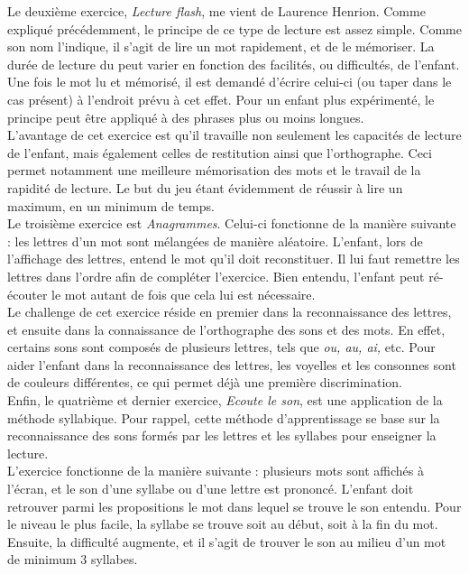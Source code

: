 Le deuxième exercice, \textit{Lecture flash}, me vient de Laurence Henrion. Comme expliqué précédemment, le principe de ce type de lecture est assez simple. Comme son nom l'indique, il s'agit de lire un mot rapidement, et de le mémoriser. La durée de lecture du peut varier en fonction des facilités, ou difficultés, de l'enfant. Une fois le mot lu et mémorisé, il est demandé d'écrire celui-ci (ou taper dans le cas présent) à l'endroit prévu à cet effet. Pour un enfant plus expérimenté, le principe peut être appliqué à des phrases plus ou moins longues.\\

L'avantage de cet exercice est qu'il travaille non seulement les capacités de lecture de l'enfant, mais également celles de restitution ainsi que l'orthographe. Ceci permet notamment une meilleure mémorisation des mots et le travail de la rapidité de lecture. Le but du jeu étant évidemment de réussir à lire un maximum, en un minimum de temps. \\

Le troisième exercice est \textit{Anagrammes}. Celui-ci fonctionne de la manière suivante : les lettres d'un mot sont mélangées de manière aléatoire. L'enfant, lors de l'affichage des lettres, entend le mot qu'il doit reconstituer. Il lui faut remettre les lettres dans l'ordre afin de compléter l'exercice. Bien entendu, l'enfant peut ré-écouter le mot autant de fois que cela lui est nécessaire.\\

Le challenge de cet exercice réside en premier dans la reconnaissance des lettres, et ensuite dans la connaissance de l'orthographe des sons et des mots. En effet, certains sons sont composés de plusieurs lettres, tels que \textit{ou, au, ai,} etc. Pour aider l'enfant dans la reconnaissance des lettres, les voyelles et les consonnes sont de couleurs différentes, ce qui permet déjà une première discrimination.\\

Enfin, le quatrième et dernier exercice, \textit{Ecoute le son}, est une application de la méthode syllabique. Pour rappel, cette méthode d'apprentissage se base sur la reconnaissance des sons formés par les lettres et les syllabes pour enseigner la lecture.\\

L'exercice fonctionne de la manière suivante : plusieurs mots sont affichés à l'écran, et le son d'une syllabe ou d'une lettre est prononcé. L'enfant doit retrouver parmi les propositions le mot dans lequel se trouve le son entendu. Pour le niveau le plus facile, la syllabe se trouve soit au début, soit à la fin du mot. Ensuite, la difficulté augmente, et il s'agit de trouver le son au milieu d'un mot de minimum 3 syllabes.\\

